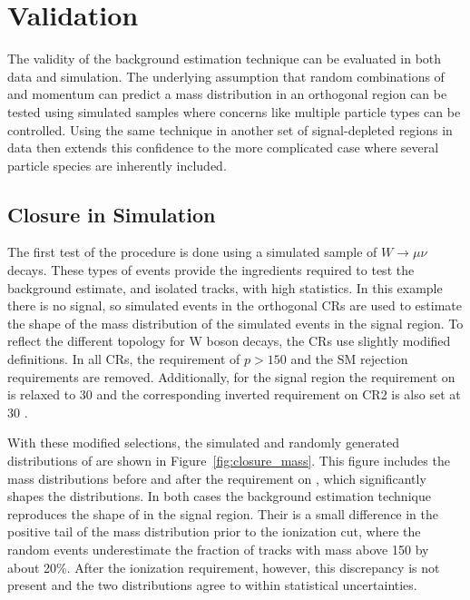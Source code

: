 
\section{Validation}

The validity of the background estimation technique can be evaluated in both data and simulation.
The underlying assumption that random combinations of \dedx and momentum can predict a mass distribution in an orthogonal region can be tested using simulated samples where concerns like multiple particle types can be controlled.
Using the same technique in another set of signal-depleted regions in data then extends this confidence to the more complicated case where several particle species are inherently included.

\subsection{Closure in Simulation}
The first test of the procedure is done using a simulated sample of $W\rightarrow\mu\nu$ decays.
These types of events provide the ingredients required to test the background estimate, \met and isolated tracks, with high statistics.
In this example there is no signal, so simulated events in the orthogonal \acp{CR} are used to estimate the shape of the mass distribution of the simulated events in the signal region.
To reflect the different topology for W boson decays, the \acp{CR} use slightly modified definitions.
In all \acp{CR}, the requirement of $p > 150$ \GeV and the \ac{SM} rejection requirements are removed.
Additionally, for the signal region the requirement on \met is relaxed to 30 \GeV and the corresponding inverted requirement on CR2 is also set at 30 \GeV.

With these modified selections, the simulated and randomly generated distributions of \mdedx are shown in Figure~\ref{fig:closure_mass}. 
This figure includes the mass distributions before and after the requirement on \dedx, which significantly shapes the distributions.
In both cases the background estimation technique reproduces the shape of \mdedx in the signal region.
Their is a small difference in the positive tail of the mass distribution prior to the ionization cut, where the random events underestimate the fraction of tracks with mass above 150 \GeV by about 20\%.
After the ionization requirement, however, this discrepancy is not present and the two distributions agree to within statistical uncertainties.

